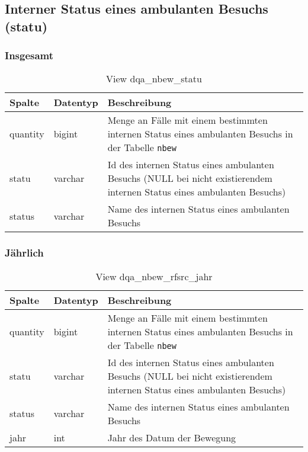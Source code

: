 \subsection{Interner Status eines ambulanten Besuchs (statu)} \label{subsec:bewStatu}

\subsubsection{Insgesamt} \label{subsubsec:bewStatuI}

\begin{table}[ht]
	\centering   
	\caption{View dqa\_nbew\_statu}
	\label{tab:bewStatuI}
	\begin{tabular}{||l|l|p{10cm}||}   		
		\hline
		Spalte & Datentyp & Beschreibung \\ [0.5ex]
		\hline\hline
		quantity & bigint & Menge an Fälle mit einem bestimmten internen Status eines ambulanten Besuchs in der Tabelle \texttt{nbew} \\
		\hline
		statu & varchar & Id des internen Status eines ambulanten Besuchs (NULL bei nicht existierendem internen Status eines ambulanten Besuchs)\\
		\hline
		status & varchar & Name des internen Status eines ambulanten Besuchs \\
		\hline
	\end{tabular}
\end{table}
\newpage
\subsubsection{Jährlich} \label{subsubsec:bewStatuJ}

\begin{table}[ht]
	\centering   
	\caption{View dqa\_nbew\_rfsrc\_jahr}
	\label{tab:bewStatuJ}
	\begin{tabular}{||l|l|p{10cm}||}   		
		\hline
		Spalte & Datentyp & Beschreibung \\ [0.5ex]
		\hline\hline
		quantity & bigint & Menge an Fälle mit einem bestimmten internen Status eines ambulanten Besuchs in der Tabelle \texttt{nbew}\\
		\hline
		statu & varchar & Id des internen Status eines ambulanten Besuchs (NULL bei nicht existierendem internen Status eines ambulanten Besuchs)\\
		\hline
		status & varchar & Name des internen Status eines ambulanten Besuchs \\
		\hline
		jahr & int &  Jahr des Datum der Bewegung \\
		\hline		
	\end{tabular}
\end{table}

